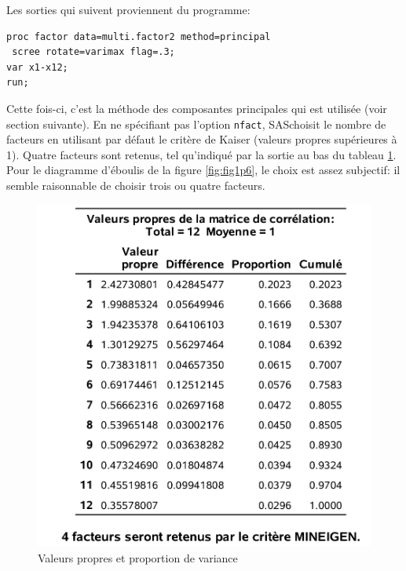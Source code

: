 \documentclass[
]{book}
\theoremstyle{definition}
\theoremstyle{definition}
\theoremstyle{definition}
\theoremstyle{remark}
\begin{document}
Les sorties qui suivent proviennent du programme:

\begin{verbatim}
proc factor data=multi.factor2 method=principal
 scree rotate=varimax flag=.3;
var x1-x12;
run;
\end{verbatim}

Cette fois-ci, c'est la méthode des composantes principales qui
est utilisée (voir section suivante). En ne spécifiant pas l'option \texttt{nfact}, \textsf{SAS}choisit le nombre de facteurs en utilisant par défaut le critère de Kaiser (valeurs propres supérieures à 1). Quatre facteurs sont retenus, tel qu'indiqué par la sortie au bas du tableau \ref{fig:fig1p7}. Pour le diagramme d'éboulis de la figure \ref{fig:fig1p6}, le choix est assez subjectif: il semble raisonnable de choisir trois ou quatre facteurs.

\begin{figure}

{\centering \includegraphics[width=0.65\linewidth]{figures/01-facto-e7} 

}

\caption{Valeurs propres et proportion de variance}\label{fig:fig1p7}
\end{figure}
\end{document}

